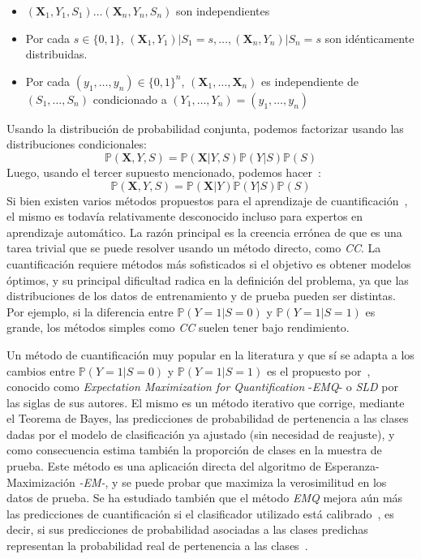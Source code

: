 \begin{itemize}
  \item $(\boldsymbol{X}_1,Y_1,S_1) \dots (\boldsymbol{X}_n,Y_n,S_n)$ son
  independientes
  \item Por cada $s \in \{0,1\}$,
  $(\boldsymbol{X}_1,Y_1)|S_1=s,\dots,(\boldsymbol{X}_n,Y_n)|S_n=s$ son
  idénticamente distribuidas.
  \item Por cada $(y_1,\dots,y_n)\in{\{0,1\}}^n$,
  $(\boldsymbol{X}_1,\dots,\boldsymbol{X}_n)$ es independiente de
  $(S_1,\dots,S_n)$ condicionado a $(Y_1,\dots,Y_n)=(y_1,\dots,y_n)$
\end{itemize}

Usando la distribución de probabilidad conjunta, podemos factorizar usando las
distribuciones condicionales:
\begin{equation}
    \mathbb{P}(\boldsymbol{X},Y,S)=\mathbb{P}(\boldsymbol{X}|Y,S)\mathbb{P}(Y|S)\mathbb{P}(S)
\end{equation}
Luego, usando el tercer supuesto mencionado, podemos
hacer~\cite{moreno2012unifying}:
\begin{equation}
    \mathbb{P}(\boldsymbol{X},Y,S)=\mathbb{P}(\boldsymbol{X}|Y)\mathbb{P}(Y|S)\mathbb{P}(S)
\end{equation}
Si bien existen varios métodos propuestos para el aprendizaje de
cuantificación~\cite{esuli2023learning, gonzalez2017review}, el mismo es todavía
relativamente desconocido incluso para expertos en aprendizaje automático. La
razón principal es la creencia errónea de que es una tarea trivial que se puede
resolver usando un método directo, como {\it CC}. La cuantificación requiere
métodos más sofisticados si el objetivo es obtener modelos óptimos, y su
principal dificultad radica en la definición del problema, ya que las
distribuciones de los datos de entrenamiento y de prueba pueden ser distintas.
Por ejemplo, si la diferencia entre $\mathbb{P}(Y=1|S=0)$ y
$\mathbb{P}(Y=1|S=1)$ es grande, los métodos simples como {\it CC\/} suelen
tener bajo rendimiento.

Un método de cuantificación muy popular en la literatura y que sí se adapta a
los cambios entre $\mathbb{P}(Y=1|S=0)$ y $\mathbb{P}(Y=1|S=1)$ es el propuesto
por~\citet{saerens2002adjusting}, conocido como {\it Expectation Maximization
for Quantification\/} -{\it EMQ\/}- o {\it SLD\/} por las siglas de sus autores.
El mismo es un método iterativo que corrige, mediante el Teorema de Bayes, las
predicciones de probabilidad de pertenencia a las clases dadas por el modelo de
clasificación ya ajustado (sin necesidad de reajuste), y como consecuencia
estima también la proporción de clases en la muestra de prueba. Este método es
una aplicación directa del algoritmo de Esperanza-Maximización {\it -EM-}, y se
puede probar que maximiza la verosimilitud en los datos de prueba. Se ha
estudiado también que el método {\it EMQ\/} mejora aún más las predicciones de
cuantificación si el clasificador utilizado está
calibrado~\cite{esuli2020critical, alexandari2020maximum}, es decir, si sus
predicciones de probabilidad asociadas a las clases predichas representan la
probabilidad real de pertenencia a las clases~\cite{guo2017calibration}.

